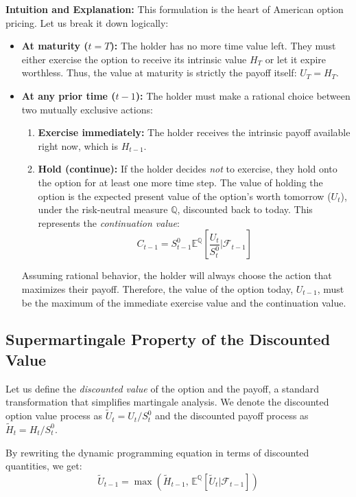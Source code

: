 \textbf{Intuition and Explanation:}
This formulation is the heart of American option pricing. Let us break it down logically:
\begin{itemize}
    \item \textbf{At maturity ($t = T$):} The holder has no more time value left. They must either exercise the option to receive its intrinsic value $H_T$ or let it expire worthless. Thus, the value at maturity is strictly the payoff itself: $U_T = H_T$.
    \item \textbf{At any prior time ($t-1$):} The holder must make a rational choice between two mutually exclusive actions:
    \begin{enumerate}
        \item \textbf{Exercise immediately:} The holder receives the intrinsic payoff available right now, which is $H_{t-1}$.
        \item \textbf{Hold (continue):} If the holder decides \textit{not} to exercise, they hold onto the option for at least one more time step. The value of holding the option is the expected present value of the option's worth tomorrow ($U_t$), under the risk-neutral measure $\mathbb{Q}$, discounted back to today. This represents the \textit{continuation value}: 
        $$ C_{t-1} = S_{t-1}^0 \mathbb{E}^{\mathbb{Q}}\left[ \frac{U_t}{S_t^0} \Big| \mathcal{F}_{t-1} \right] $$
    \end{enumerate}
    Assuming rational behavior, the holder will always choose the action that maximizes their payoff. Therefore, the value of the option today, $U_{t-1}$, must be the maximum of the immediate exercise value and the continuation value.
\end{itemize}

\subsection{Supermartingale Property of the Discounted Value}

Let us define the \textit{discounted value} of the option and the payoff, a standard transformation that simplifies martingale analysis. We denote the discounted option value process as $\tilde{U}_t = U_t / S_t^0$ and the discounted payoff process as $\tilde{H}_t = H_t / S_t^0$.

By rewriting the dynamic programming equation in terms of discounted quantities, we get:
$$
\tilde{U}_{t-1} = \max\left( \tilde{H}_{t-1}, \, \mathbb{E}^{\mathbb{Q}}\left[ \tilde{U}_t \Big| \mathcal{F}_{t-1} \right] \right)
$$

